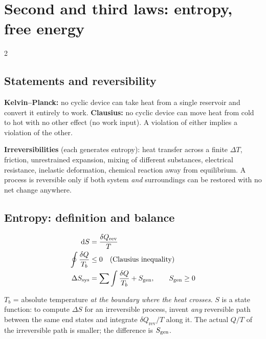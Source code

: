 \section{Second and third laws: entropy, free energy}\label{sec:secondlaw}
\begin{multicols}{2}
\subsection{Statements and reversibility}\label{sec:2ndstatements}
\CORE{} \textbf{Kelvin--Planck:} no cyclic device can take heat from a single reservoir and convert it entirely to work. \textbf{Clausius:} no cyclic device can move heat from cold to hot with no other effect (no work input). A violation of either implies a violation of the other.

\textbf{Irreversibilities} (each generates entropy): heat transfer across a finite $\Delta T$, friction, unrestrained expansion, mixing of different substances, electrical resistance, inelastic deformation, chemical reaction away from equilibrium. A process is reversible only if both system \emph{and} surroundings can be restored with no net change anywhere.

\subsection{Entropy: definition and balance}\label{sec:entropy}
\CORE{}
\begin{formulabox}
\vspace{-6pt}
\begin{align}
\mathrm{d} S &= \frac{\delta Q_{\text{rev}}}{T} \label{F:entropy:def}\\
\oint\frac{\delta Q}{T_b} &\le 0\quad\text{(Clausius inequality)} \label{F:entropy:clausius}\\
\Delta S_{\text{sys}} &= \sum\int\frac{\delta Q}{T_b}+S_{\mathrm{gen}},\qquad S_{\mathrm{gen}}\ge0 \label{F:entropy:balance}
\end{align}
\end{formulabox}
$T_b$ = absolute temperature \emph{at the boundary where the heat crosses}. $S$ is a state function: to compute $\Delta S$ for an irreversible process, invent \emph{any} reversible path between the same end states and integrate $\delta Q_{\text{rev}}/T$ along it. The actual $Q/T$ of the irreversible path is smaller; the difference is $S_{\mathrm{gen}}$.


\end{multicols}
